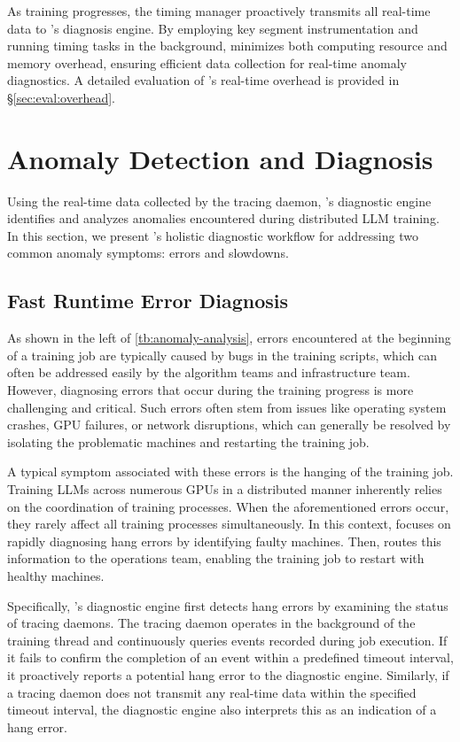 As training progresses, the timing manager proactively transmits all real-time data to \sysname{}’s diagnosis engine.
By employing key segment instrumentation and running timing tasks in the background, \sysname{} minimizes both computing resource and memory overhead, ensuring efficient data collection for real-time anomaly diagnostics.
A detailed evaluation of \sysname{}’s real-time overhead is provided in \S\ref{sec:eval:overhead}.

\section{Anomaly Detection and Diagnosis}
Using the real-time data collected by the tracing daemon, \sysname{}’s diagnostic engine identifies and analyzes anomalies encountered during distributed LLM training.
In this section, we present \sysname{}’s holistic diagnostic workflow for addressing two common anomaly symptoms: errors and slowdowns.

\subsection{Fast Runtime Error Diagnosis}

As shown in the left of \autoref{tb:anomaly-analysis}, errors encountered at the beginning of a training job are typically caused by bugs in the training scripts, which can often be addressed easily by the algorithm teams and infrastructure team.
However, diagnosing errors that occur during the training progress is more challenging and critical.
Such errors often stem from issues like operating system crashes, GPU failures, or network disruptions, which can generally be resolved by isolating the problematic machines and restarting the training job.

A typical symptom associated with these errors is the hanging of the training job.
Training LLMs across numerous GPUs in a distributed manner inherently relies on the coordination of training processes.
When the aforementioned errors occur, they rarely affect all training processes simultaneously.
In this context, \sysname{} focuses on rapidly diagnosing hang errors by identifying faulty machines. Then, \sysname{} routes this information to the operations team, enabling the training job to restart with healthy machines.

Specifically, \sysname{}’s diagnostic engine first detects hang errors by examining the status of tracing daemons.
The tracing daemon operates in the background of the training thread and continuously queries events recorded during job execution.
If it fails to confirm the completion of an event within a predefined timeout interval, it proactively reports a potential hang error to the diagnostic engine.
Similarly, if a tracing daemon does not transmit any real-time data within the specified timeout interval, the diagnostic engine also interprets this as an indication of a hang error.

